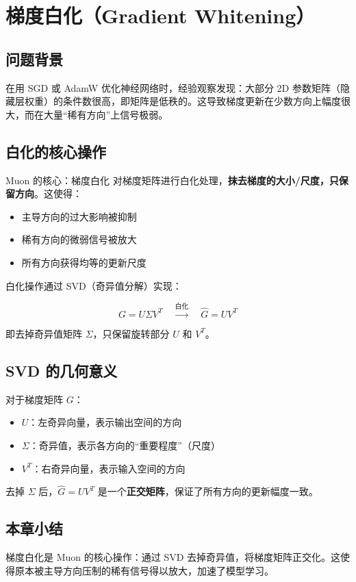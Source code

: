 \section{梯度白化（Gradient Whitening）}

\subsection{问题背景}

在用 SGD 或 AdamW 优化神经网络时，经验观察发现：大部分 2D 参数矩阵（隐藏层权重）的条件数很高，即矩阵是低秩的。这导致梯度更新在少数方向上幅度很大，而在大量``稀有方向''上信号极弱。

\subsection{白化的核心操作}

\begin{importantbox}{Muon 的核心：梯度白化}
对梯度矩阵进行白化处理，\textbf{抹去梯度的大小/尺度，只保留方向}。这使得：
\begin{itemize}
  \item 主导方向的过大影响被抑制
  \item 稀有方向的微弱信号被放大
  \item 所有方向获得均等的更新尺度
\end{itemize}
\end{importantbox}

白化操作通过 SVD（奇异值分解）实现：

$$
G = U \Sigma V^T \quad \xrightarrow{\text{白化}} \quad \hat{G} = U V^T
$$

即去掉奇异值矩阵 $\Sigma$，只保留旋转部分 $U$ 和 $V^T$。

\subsection{SVD 的几何意义}

对于梯度矩阵 $G$：
\begin{itemize}
  \item $U$：左奇异向量，表示输出空间的方向
  \item $\Sigma$：奇异值，表示各方向的``重要程度''（尺度）
  \item $V^T$：右奇异向量，表示输入空间的方向
\end{itemize}

去掉 $\Sigma$ 后，$\hat{G} = UV^T$ 是一个\textbf{正交矩阵}，保证了所有方向的更新幅度一致。

\subsection{本章小结}

梯度白化是 Muon 的核心操作：通过 SVD 去掉奇异值，将梯度矩阵正交化。这使得原本被主导方向压制的稀有信号得以放大，加速了模型学习。

